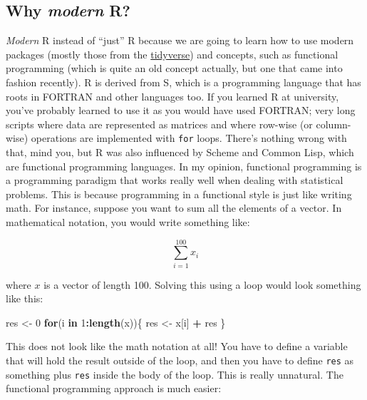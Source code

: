 \documentclass[]{gitbook}
\newenvironment{Shaded}{\begin{snugshade}}{\end{snugshade}}
\newcommand{\ControlFlowTok}[1]{\textcolor[rgb]{0.13,0.29,0.53}{\textbf{#1}}}
\newcommand{\DecValTok}[1]{\textcolor[rgb]{0.00,0.00,0.81}{#1}}
\newcommand{\KeywordTok}[1]{\textcolor[rgb]{0.13,0.29,0.53}{\textbf{#1}}}
\newcommand{\NormalTok}[1]{#1}
\newcommand{\OperatorTok}[1]{\textcolor[rgb]{0.81,0.36,0.00}{\textbf{#1}}}
\newcommand{\StringTok}[1]{\textcolor[rgb]{0.31,0.60,0.02}{#1}}
\begin{document}
\hypertarget{why-modern-r}{%
\subsection*{\texorpdfstring{Why \emph{modern} R?}{Why modern R?}}\label{why-modern-r}}

\emph{Modern} R instead of ``just'' R because we are going to learn how to use modern packages (mostly
those from the \href{https://www.tidyverse.org/}{tidyverse}) and concepts, such as functional
programming (which is quite an old concept actually, but one that came into fashion recently). R is
derived from S, which is a programming language that has roots in FORTRAN and other languages too.
If you learned R at university, you've probably learned to use it as you would have used FORTRAN;
very long scripts where data are represented as matrices and where row-wise (or column-wise)
operations are implemented with \texttt{for} loops. There's nothing wrong with that, mind you, but R
was also influenced by Scheme and Common Lisp, which are functional programming languages.
In my opinion, functional programming is a programming paradigm that works really well when dealing
with statistical problems. This is because programming in a functional style is just like
writing math. For instance, suppose you want to sum all the elements of a vector. In mathematical
notation, you would write something like:

\[
\sum_{i = 1}^{100} x_{i}
\]

where \(x\) is a vector of length 100. Solving this using a loop would look something like this:

\begin{Shaded}
\begin{Highlighting}[]
\NormalTok{res <-}\StringTok{ }\DecValTok{0}
\ControlFlowTok{for}\NormalTok{(i }\ControlFlowTok{in} \DecValTok{1}\OperatorTok{:}\KeywordTok{length}\NormalTok{(x))\{}
\NormalTok{  res <-}\StringTok{ }\NormalTok{x[i] }\OperatorTok{+}\StringTok{ }\NormalTok{res}
\NormalTok{\}}
\end{Highlighting}
\end{Shaded}

This does not look like the math notation at all! You have to define a variable that will hold
the result outside of the loop, and then you have to define \texttt{res} as something plus \texttt{res} inside
the body of the loop. This is really unnatural. The functional programming approach is much
easier:
\end{document}
